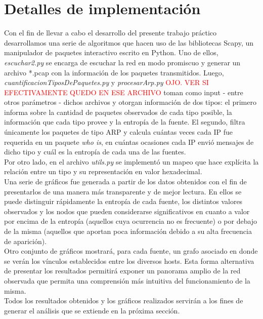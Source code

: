 \section{Detalles de implementaci\'on}

Con el fin de llevar a cabo el desarrollo del presente trabajo pr\'actico desarrollamos una serie de algoritmos que hacen uso de las bibliotecas Scapy, un manipulador de paquetes interactivo escrito en Python. Uno de ellos, \textit{escuchar2.py} se encarga de escuchar la red en modo promiscuo y generar un archivo *.pcap con la informaci\'on de los paquetes transmitidos.  Luego, \textit{cuantificacionTiposDePaquetes.py} y \textit{procesarArp.py} \textcolor{red}{OJO. VER SI EFECTIVAMENTE QUEDO EN ESE ARCHIVO} toman como input - entre otros par\'ametros - dichos archivos y otorgan informaci\'on de dos tipos: el primero informa sobre la cantidad de paquetes observados de cada tipo posible, la informaci\'on que cada tipo provee y la entrop\'ia de la fuente. El segundo, filtra \'unicamente los paquetes de tipo ARP y calcula cu\'antas veces cada IP fue requerida en un paquete \textit{who is}, en cu\'antas ocasiones cada IP envi\'o mensajes de dicho tipo y cu\'al es la entrop\'ia de cada una de las fuentes. \\
Por otro lado, en el archivo \textit{utils.py} se implement\'o un mapeo que hace expl\'icita la relaci\'on entre un tipo y su representaci\'on en valor hexadecimal. \\

Una serie de gr\'aficos fue generada a partir de los datos obtenidos con el fin de presentarlos de una manera m\'as transparente y de mejor lectura. En ellos se puede distinguir r\'apidamente la entrop\'ia de cada fuente, los distintos valores observados y los nodos que pueden considerarse significativos en cuanto a valor por encima de la entrop\'ia (aquellos cuya ocurrencia no es frecuente) o por debajo de la misma (aquellos que aportan poca informaci\'on debido a su alta frecuencia de aparici\'on).\\
Otro conjunto de gr\'aficos mostrar\'a, para cada fuente, un grafo asociado en donde se ver\'an los v\'inculos establecidos entre los diversos hosts. Esta forma alternativa de presentar los resultados permitir\'a exponer un panorama amplio de la red observada que permita una comprensi\'on m\'as intuitiva del funcionamiento de la misma.\\

Todos los resultados obtenidos y los gr\'aficos realizados servir\'an a los fines de generar el an\'alisis que se extiende en la pr\'oxima secci\'on.
